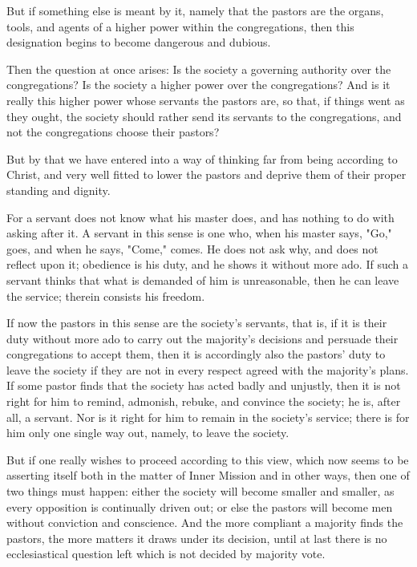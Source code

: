 But if something else is meant by it, namely that the pastors are the organs, tools, and agents of a higher power within the congregations, then this designation begins to become dangerous and dubious.

Then the question at once arises: Is the society a governing authority over the congregations? Is the society a higher power over the congregations? And is it really this higher power whose servants the pastors are, so that, if things went as they ought, the society should rather send its servants to the congregations, and not the congregations choose their pastors?

But by that we have entered into a way of thinking far from being according to Christ, and very well fitted to lower the pastors and deprive them of their proper standing and dignity.

For a servant does not know what his master does, and has nothing to do with asking after it. A servant in this sense is one who, when his master says, "Go," goes, and when he says, "Come," comes. He does not ask why, and does not reflect upon it; obedience is his duty, and he shows it without more ado. If such a servant thinks that what is demanded of him is unreasonable, then he can leave the service; therein consists his freedom.

If now the pastors in this sense are the society’s servants, that is, if it is their duty without more ado to carry out the majority’s decisions and persuade their congregations to accept them, then it is accordingly also the pastors’ duty to leave the society if they are not in every respect agreed with the majority’s plans. If some pastor finds that the society has acted badly and unjustly, then it is not right for him to remind, admonish, rebuke, and convince the society; he is, after all, a servant. Nor is it right for him to remain in the society’s service; there is for him only one single way out, namely, to leave the society.

But if one really wishes to proceed according to this view, which now seems to be asserting itself both in the matter of Inner Mission and in other ways, then one of two things must happen: either the society will become smaller and smaller, as every opposition is continually driven out; or else the pastors will become men without conviction and conscience. And the more compliant a majority finds the pastors, the more matters it draws under its decision, until at last there is no ecclesiastical question left which is not decided by majority vote.


